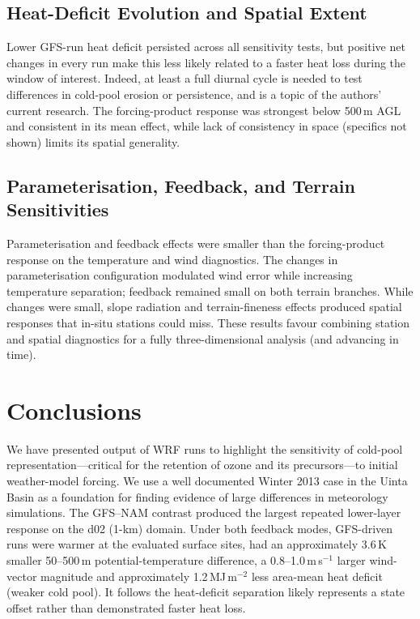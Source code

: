 \documentclass[air,article,submit,moreauthors]{Definitions/mdpi}
\begin{document}
\subsection{Heat-Deficit Evolution and Spatial Extent}
\label{sec:v3-disc-spatial}

Lower GFS-run heat deficit persisted across all sensitivity tests, but positive net changes in every run make this less likely related to a faster heat loss during the window of interest.
Indeed, at least a full diurnal cycle is needed to test differences in cold-pool erosion or persistence, and is a topic of the authors' current research.
The forcing-product response was strongest below 500\,m AGL and consistent in its mean effect, while lack of consistency in space (specifics not shown) limits its spatial generality.

\subsection{Parameterisation, Feedback, and Terrain Sensitivities}
\label{sec:v3-disc-process}

Parameterisation and feedback effects were smaller than the forcing-product response on the temperature and wind diagnostics.
The changes in parameterisation configuration modulated wind error while increasing temperature separation; feedback remained small on both terrain branches.
While changes were small, slope radiation and terrain-fineness effects produced spatial responses that in-situ stations could miss.
These results favour combining station and spatial diagnostics for a fully three-dimensional analysis (and advancing in time).

\section{Conclusions}
\label{sec:v3-conclusions}

We have presented output of WRF runs to highlight the sensitivity of cold-pool representation---critical for the retention of ozone and its precursors---to initial weather-model forcing.
We use a well documented Winter 2013 case in the Uinta Basin as a foundation for finding evidence of large differences in meteorology simulations.
The GFS--NAM contrast produced the largest repeated lower-layer response on the d02 (1-km) domain.
Under both feedback modes, GFS-driven runs were warmer at the evaluated surface sites, had an approximately 3.6\,K smaller 50--500\,m potential-temperature difference, a 0.8--1.0\,m\,s$^{-1}$ larger wind-vector magnitude and approximately 1.2\,MJ\,m$^{-2}$ less area-mean heat deficit (weaker cold pool).
It follows the heat-deficit separation likely represents a state offset rather than demonstrated faster heat loss.
\end{document}
